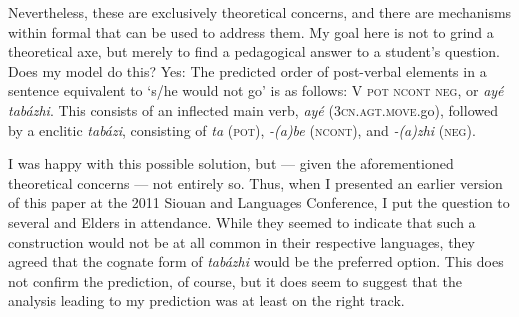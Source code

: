 \documentclass[output=paper]{LSP/langsci}
\begin{document}
Nevertheless, these are exclusively theoretical concerns, and there are mechanisms within formal  that can be used to address them. My goal here is not to grind a theoretical axe, but merely to find a pedagogical answer to a student's question. Does my model do this? Yes: The predicted order of post-verbal elements in a  sentence equivalent to  `s/he would not go' is as follows: V \textsc{pot ncont} \textsc{neg}, or \textit{ay\'e tabázhi}. This consists of an inflected main verb, \textit{ay\'e} (\textsc{3cn.agt.move}.go), followed by a  enclitic \textit{tabázi}, consisting of \textit{ta} (\textsc{pot}), \textit{-(a)be} (\textsc{ncont}), and \textit{-(a)zhi} (\textsc{neg}).
	
I was happy with this possible solution, but --- given the aforementioned theoretical concerns --- not entirely so. Thus, when I presented an earlier version of this paper at the 2011 Siouan and  Languages Conference, I put the question to several  and  Elders in attendance. While they seemed to indicate that such a construction would not be at all common in their respective languages, they agreed that the cognate form of  \textit{tabázhi} would be the preferred option. This does not confirm the  prediction, of course, but it does seem to suggest that the analysis leading to my prediction was at least on the right track.
\end{document}
